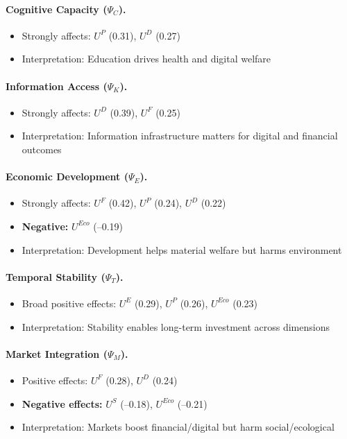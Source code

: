 \paragraph{Cognitive Capacity ($\Psi_C$).}
\begin{itemize}
\item Strongly affects: $U^P$ (0.31), $U^D$ (0.27)
\item Interpretation: Education drives health and digital welfare
\end{itemize}

\paragraph{Information Access ($\Psi_K$).}
\begin{itemize}
\item Strongly affects: $U^D$ (0.39), $U^F$ (0.25)
\item Interpretation: Information infrastructure matters for digital and financial outcomes
\end{itemize}

\paragraph{Economic Development ($\Psi_E$).}
\begin{itemize}
\item Strongly affects: $U^F$ (0.42), $U^P$ (0.24), $U^D$ (0.22)
\item \textbf{Negative:} $U^{Eco}$ (--0.19)
\item Interpretation: Development helps material welfare but harms environment
\end{itemize}

\paragraph{Temporal Stability ($\Psi_T$).}
\begin{itemize}
\item Broad positive effects: $U^E$ (0.29), $U^P$ (0.26), $U^{Eco}$ (0.23)
\item Interpretation: Stability enables long-term investment across dimensions
\end{itemize}

\paragraph{Market Integration ($\Psi_M$).}
\begin{itemize}
\item Positive effects: $U^F$ (0.28), $U^D$ (0.24)
\item \textbf{Negative effects:} $U^S$ (--0.18), $U^{Eco}$ (--0.21)
\item Interpretation: Markets boost financial/digital but harm social/ecological
\end{itemize}

